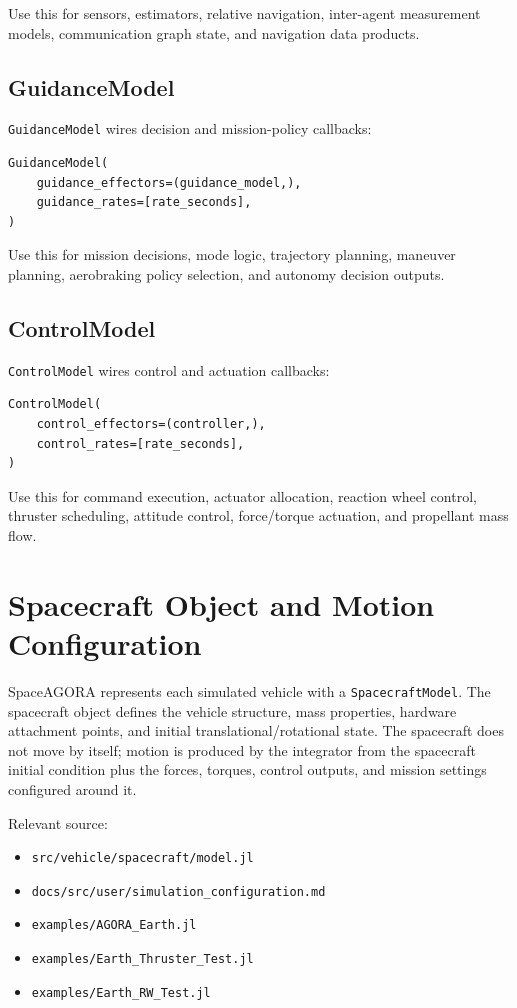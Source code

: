 \documentclass[11pt]{article}
\begin{document}
Use this for sensors, estimators, relative navigation, inter-agent measurement
models, communication graph state, and navigation data products.

\subsection{GuidanceModel}

\texttt{GuidanceModel} wires decision and mission-policy callbacks:

\begin{lstlisting}
GuidanceModel(
    guidance_effectors=(guidance_model,),
    guidance_rates=[rate_seconds],
)
\end{lstlisting}

Use this for mission decisions, mode logic, trajectory planning, maneuver
planning, aerobraking policy selection, and autonomy decision outputs.

\subsection{ControlModel}

\texttt{ControlModel} wires control and actuation callbacks:

\begin{lstlisting}
ControlModel(
    control_effectors=(controller,),
    control_rates=[rate_seconds],
)
\end{lstlisting}

Use this for command execution, actuator allocation, reaction wheel control,
thruster scheduling, attitude control, force/torque actuation, and propellant
mass flow.

\section{Spacecraft Object and Motion Configuration}

SpaceAGORA represents each simulated vehicle with a \texttt{SpacecraftModel}.
The spacecraft object defines the vehicle structure, mass properties, hardware
attachment points, and initial translational/rotational state. The spacecraft
does not move by itself; motion is produced by the integrator from the
spacecraft initial condition plus the forces, torques, control outputs, and
mission settings configured around it.

Relevant source:
\begin{itemize}
  \item \texttt{src/vehicle/spacecraft/model.jl}
  \item \texttt{docs/src/user/simulation\_configuration.md}
  \item \texttt{examples/AGORA\_Earth.jl}
  \item \texttt{examples/Earth\_Thruster\_Test.jl}
  \item \texttt{examples/Earth\_RW\_Test.jl}
\end{itemize}
\end{document}
